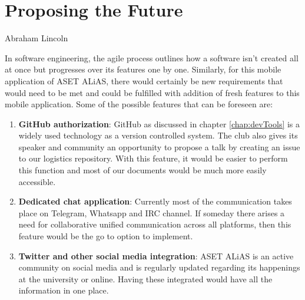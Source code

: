 \chapter{Proposing the Future}
\begin{epigraphs}
        {Abraham Lincoln}
\end{epigraphs}
In software engineering, the agile process outlines how a software isn't created all at once but progresses over its features one by one. Similarly, for this mobile application of ASET ALiAS, there would certainly be new requirements that would need to be met and could be fulfilled with addition of fresh features to this mobile application. Some of the possible features that can be foreseen are:
\begin{enumerate}
\item \textbf{GitHub authorization}: GitHub as discussed in chapter \ref{chap:devTools} is a widely used technology as a version controlled system. The club also gives its speaker and community an opportunity to propose a talk by creating an issue to our logistics repository. With this feature, it would be easier to perform this function and most of our documents would be much more easily accessible. 
\item \textbf{Dedicated chat application}: Currently most of the communication takes place on Telegram, Whatsapp and IRC channel. If someday there arises a need for collaborative unified communication across all platforms, then this feature would be the go to option to implement.
\item \textbf{Twitter and other social media integration}: ASET ALiAS is an active community on social media and is regularly updated regarding its happenings at the university or online. Having these integrated would have all the information in one place.
\end{enumerate}

